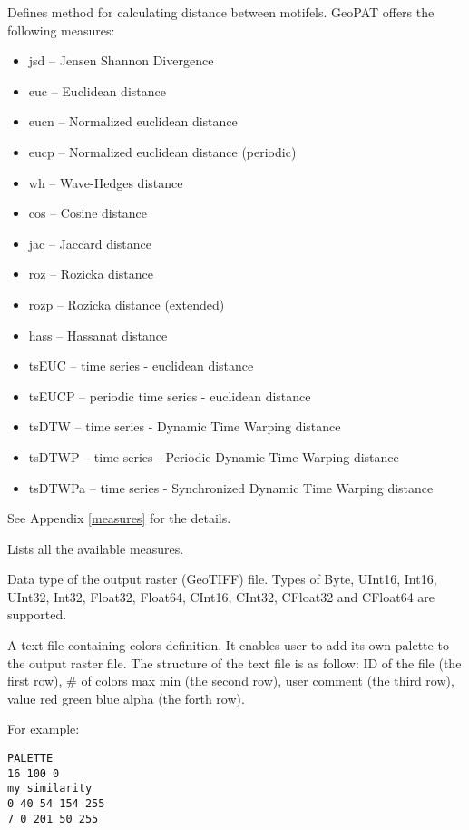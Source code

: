 
Defines method for calculating distance between motifels. 
GeoPAT offers the following measures: 
\begin{itemize}
	\item jsd -- Jensen Shannon Divergence
	\item euc -- Euclidean distance
	\item eucn -- Normalized euclidean distance
	\item eucp -- Normalized euclidean distance (periodic)
	\item wh -- Wave-Hedges distance
	\item cos -- Cosine distance
	\item jac -- Jaccard distance
	\item roz -- Rozicka distance
	\item rozp -- Rozicka distance (extended)
	\item hass -- Hassanat distance
	\item tsEUC -- time series - euclidean distance
	\item tsEUCP -- periodic time series - euclidean distance
	\item tsDTW -- time series - Dynamic Time Warping distance
	\item tsDTWP -- time series - Periodic Dynamic Time Warping distance
	\item tsDTWPa -- time series - Synchronized Dynamic Time Warping distance
\end{itemize}
See Appendix \ref{measures} for the details.


Lists all the available measures.


Data type of the output raster (GeoTIFF) file. Types of Byte, UInt16, Int16, UInt32, Int32, Float32, Float64, CInt16, CInt32, CFloat32 and CFloat64 are supported.


A text file containing colors definition. 
It enables user to add its own palette to the output raster file.
The structure of the text file is as follow:
ID of the file (the first row), \# of colors max min (the second row), user comment (the third row), value red green blue alpha (the forth row). 

For example: \\
\begin{minipage}{\linewidth}
\begin{lstlisting}
PALETTE
16 100 0
my similarity
0 40 54 154 255
7 0 201 50 255
\end{lstlisting}
\end{minipage}

